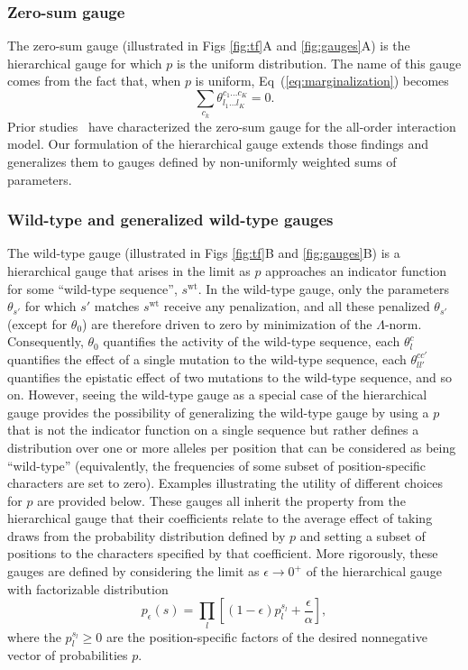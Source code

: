 \documentclass[10pt,letterpaper]{article}
\newcommand{\eq}[1]{Eq\ (\ref{#1})}
\newcommand{\mywt}{\textrm{wt}}
\begin{document}
\subsubsection*{Zero-sum gauge}
The zero-sum gauge (illustrated in Figs \ref{fig:tf}A and \ref{fig:gauges}A) is the hierarchical gauge for which $p$ is the uniform distribution. The name of this gauge comes from the fact that, when $p$ is uniform, \eq{eq:marginalization} becomes
\begin{equation}
	\sum_{c_k} \theta_{l_1 \ldots l_K}^{c_1 \ldots c_K} = 0.  
\end{equation} 
Prior studies~\cite{Park:2023aa,Metzger:2024aa}
have characterized the zero-sum gauge for the all-order interaction model. Our formulation of the hierarchical gauge extends those findings and generalizes them to gauges defined by non-uniformly weighted sums of parameters.  


\subsubsection*{Wild-type and generalized wild-type gauges} 
The wild-type gauge (illustrated in Figs \ref{fig:tf}B and \ref{fig:gauges}B) is a hierarchical gauge that arises in the limit as $p$ approaches an indicator function for some ``wild-type sequence'', $s^\mywt$. In the wild-type gauge, only the parameters $\theta_{s'}$ for which $s'$ matches $s^\mywt$ receive any penalization, and all these penalized $\theta_{s'}$ (except for $\theta_0$) are therefore driven to zero by minimization of the $\Lambda$-norm. Consequently, $\theta_{0}$ quantifies the activity of the wild-type sequence, each $\theta_{l}^c$ quantifies the effect of a single mutation to the wild-type sequence, each $\theta_{ll'}^{cc'}$ quantifies the epistatic effect of two mutations to the wild-type sequence, and so on. However, seeing the wild-type gauge as a special case of the hierarchical gauge provides the possibility of generalizing the wild-type gauge by using a $p$ that is not the indicator function on a single sequence but rather defines a distribution over one or more alleles per position that can be considered as being ``wild-type'' (equivalently, the frequencies of some subset of position-specific characters are set to zero). Examples illustrating the utility of different choices for $p$ are provided below. These gauges all inherit the property from the hierarchical gauge that their coefficients relate to the average effect of taking draws from the probability distribution defined by $p$ and setting a subset of positions to the characters specified by that coefficient. More rigorously, these gauges are defined by considering the limit as ${\epsilon\rightarrow 0^+}$ of the hierarchical gauge with factorizable distribution
\begin{equation}
p_\epsilon(s) = \prod_l \left[ (1-\epsilon) p_l^{s_l} + \frac{\epsilon}{\alpha} \right], 
\end{equation}
where the $p_l^{s_l}\geq 0$ are the position-specific factors of the desired nonnegative vector of probabilities $p$. 
\end{document}
